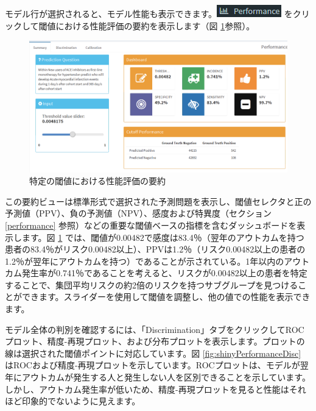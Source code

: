 \documentclass[
  11pt]{book}
\theoremstyle{definition}
\theoremstyle{definition}
\theoremstyle{definition}
\theoremstyle{definition}
\theoremstyle{remark}
\begin{document}
モデル行が選択されると、モデル性能も表示できます。\includegraphics{images/PatientLevelPrediction/performance.png} をクリックして閾値における性能評価の要約を表示します（図 \ref{fig:shinyPerformanceSum}参照）。

\begin{figure}

{\centering \includegraphics[width=1\linewidth]{images/PatientLevelPrediction/shiny/shinyPerformanceSum} 

}

\caption{特定の閾値における性能評価の要約}\label{fig:shinyPerformanceSum}
\end{figure}

この要約ビューは標準形式で選択された予測問題を表示し、閾値セレクタと正の予測値（PPV）、負の予測値（NPV）、感度および特異度（セクション \ref{performance} 参照）などの重要な閾値ベースの指標を含むダッシュボードを表示します。図 \ref{fig:shinyPerformanceSum} では、閾値が0.00482で感度は83.4％（翌年のアウトカムを持つ患者の83.4％がリスク0.00482以上）、PPVは1.2％（リスク0.00482以上の患者の1.2％が翌年にアウトカムを持つ）であることが示されている。1年以内のアウトカム発生率が0.741％であることを考えると、リスクが0.00482以上の患者を特定することで、集団平均リスクの約2倍のリスクを持つサブグループを見つけることができます。スライダーを使用して閾値を調整し、他の値での性能を表示できます。

モデル全体の判別を確認するには、「Discrimination」タブをクリックしてROCプロット、精度-再現プロット、および分布プロットを表示します。プロットの線は選択された閾値ポイントに対応しています。図 \ref{fig:shinyPerformanceDisc} はROCおよび精度-再現プロットを示しています。ROCプロットは、モデルが翌年にアウトカムが発生する人と発生しない人を区別できることを示しています。しかし、アウトカム発生率が低いため、精度-再現プロットを見ると性能はそれほど印象的でないように見えます。
\end{document}
